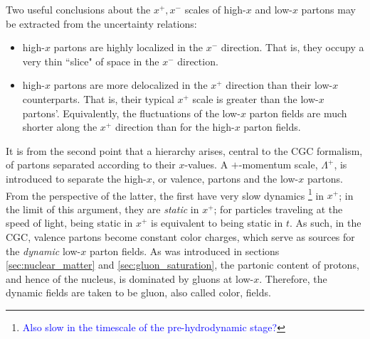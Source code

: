 Two useful conclusions about the $x^+,x^-$  scales of high-$x$ and low-$x$ partons may be extracted from the uncertainty relations:
\begin{itemize}
	\item[1)] high-$x$ partons are highly localized in the $x^-$ direction. That is, they occupy a very thin ``slice" of space in the $x^-$ direction.
	\item[2)] high-$x$ partons are more delocalized in the $x^+$ direction than their low-$x$ counterparts. That is, their typical $x^+$ scale %
		is greater than the low-$x$ partons'. Equivalently, the fluctuations of the low-$x$ parton fields are much shorter along the $x^+$ direction than for the high-$x$ parton fields.
\end{itemize}


It is from the second point that a hierarchy arises, central to the \gls{CGC} formalism, of partons separated according to their $x$-values. A $+$-momentum scale, $\Lambda^+$, is introduced to separate the high-$x$, or valence, partons and the low-$x$ partons. From the perspective of the latter, the first have very slow dynamics\textcolor{red}{ \footnote{\textcolor{blue}{Also slow in the timescale of the pre-hydrodynamic stage?}}} in $x^+$; in the limit of this argument, they are \emph{static} in $x^+$; for particles traveling at the speed of light, being static in $x^+$ is equivalent to being static in $t$. As such, in the \gls{CGC}, valence partons become constant color charges, which serve as sources for the \emph{dynamic} low-$x$ parton fields.
As was introduced in sections \ref{sec:nuclear_matter} and \ref{sec:gluon_saturation}, the partonic content of protons, and hence of the nucleus, is dominated by gluons at low-$x$. Therefore, the dynamic fields are taken to be gluon, also called color, fields.


